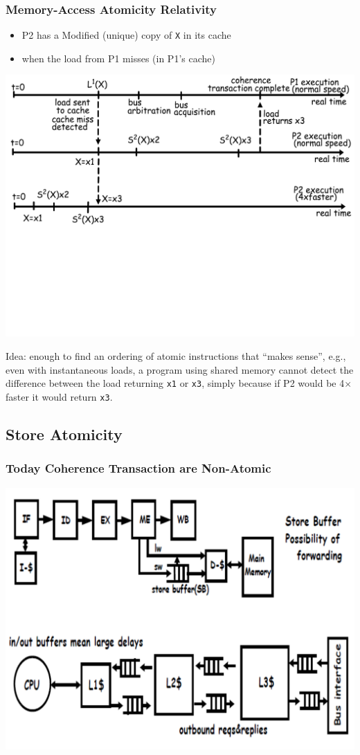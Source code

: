 \documentclass{beamer}
\newcommand{\emp}[1]{\textcolor{DikuRed}{ #1}}
\begin{document}
\begin{frame}[fragile,t]
\frametitle{Memory-Access Atomicity Relativity}

\begin{itemize}
    \item P2 has a Modified (unique) copy of {\tt X} in its cache
    \item when the load from P1 misses (in P1's cache)
\end{itemize}

{\center \includegraphics[width=59ex]{Ch7Figs/CoherenceEG1}}\pause
\vspace{-18ex}

\emp{Idea: enough to find an ordering of atomic instructions that ``makes sense''}, e.g.,
even with instantaneous loads, a program using shared memory 
cannot detect the difference between the load returning {\tt x1} or 
{\tt x3}, simply because if P2 would be 4$\times$ faster it would return {\tt x3}.

\end{frame}


\subsection{Store Atomicity}

\begin{frame}[fragile,t]
\frametitle{Today Coherence Transaction are Non-Atomic}

{\center \includegraphics[width=59ex]{Ch7Figs/SoteBuffs}}\pause

\end{frame}
\end{document}
